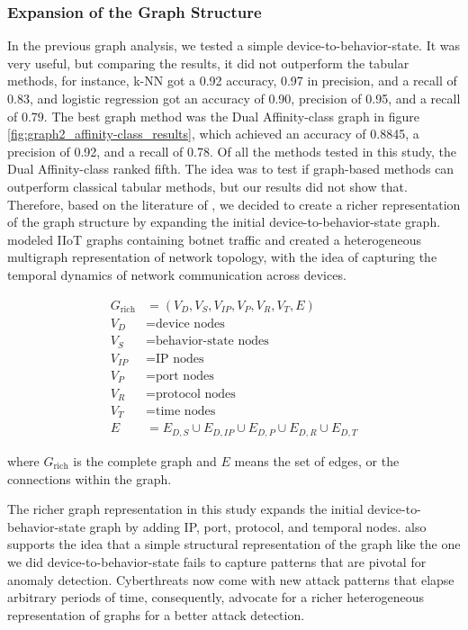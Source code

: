 \documentclass[final,5p,times,twocolumn]{elsarticle}
\begin{document}
\subsubsection{Expansion of the Graph Structure}
\label{Expansion of the Graph Structure}
In the previous graph analysis, we tested a simple device-to-behavior-state. It was very useful, but comparing the results, it did not outperform the tabular methods, for instance, k-NN got a 0.92 accuracy, 0.97 in precision, and a recall of 0.83, and logistic regression got an accuracy of 0.90, precision of 0.95, and a recall of 0.79. The best graph method was the Dual Affinity-class graph in figure \ref{fig:graph2_affinity-class_results}, which achieved an accuracy of 0.8845, a precision of 0.92, and a recall of 0.78. Of all the methods tested in this study, the Dual Affinity-class ranked fifth. The idea was to test if graph-based methods can outperform classical tabular methods, but our results did not show that. Therefore, based on the literature of \citep{altaf_gnn-based_2024},  we decided to create a richer representation of the graph structure by expanding the initial device-to-behavior-state graph. \citep{altaf_gnn-based_2024} modeled IIoT graphs containing botnet traffic and created a heterogeneous multigraph representation of network topology, with the idea of capturing the temporal dynamics of network communication across devices.

\[
\begin{aligned}
G_{\text{rich}} &= (V_D, V_S, V_{IP}, V_P, V_R, V_T, E) \\
V_D &= \text{device nodes} \\
V_S &= \text{behavior-state nodes} \\
V_{IP} &= \text{IP nodes} \\
V_P &= \text{port nodes} \\
V_R &= \text{protocol nodes} \\
V_T &= \text{time nodes} \\
E &= E_{D,S} \cup E_{D,IP} \cup E_{D,P} \cup E_{D,R} \cup E_{D,T}
\end{aligned}
\]

where \(G_{\text{rich}}\) is the complete graph and \(E\) means the set of edges, or the connections within the graph.

The richer graph representation in this study expands the initial device-to-behavior-state graph by adding IP, port, protocol, and temporal nodes. \citep{bilot2023graph} also supports the idea that a simple structural representation of the graph like the one we did device-to-behavior-state fails to capture patterns that are pivotal for anomaly detection. Cyberthreats now come with new attack patterns that elapse arbitrary periods of time, consequently, \citep{bilot2023graph} advocate for a richer heterogeneous representation of graphs for a better attack detection.
\end{document}
